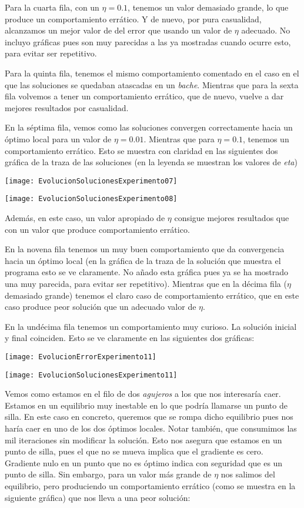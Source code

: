 \documentclass[11pt]{article}
\begin{document}
Para la cuarta fila, con un $\eta = 0.1$, tenemos un valor demasiado grande, lo que produce un comportamiento errático. Y de nuevo, por pura casualidad, alcanzamos un mejor valor de del error que usando un valor de $\eta$ adecuado. No incluyo gráficas pues son muy parecidas a las ya mostradas cuando ocurre esto, para evitar ser repetitivo.

Para la quinta fila, tenemos el mismo comportamiento comentado en el caso en el que las soluciones se quedaban atascadas en un \emph{bache}. Mientras que para la sexta fila volvemos a tener un comportamiento errático, que de nuevo, vuelve a dar mejores resultados por casualidad.

En la séptima fila, vemos como las soluciones convergen correctamente hacia un óptimo local para un valor de $\eta = 0.01$. Mientras que para $\eta = 0.1$, tenemos un comportamiento errático. Esto se muestra con claridad en las siguientes dos gráfica de la traza de las soluciones (en la leyenda se muestran los valores de \emph{eta})

\texttt{[image: EvolucionSolucionesExperimento07]}

\texttt{[image: EvolucionSolucionesExperimento08]}

Además, en este caso, un valor apropiado de $\eta$ consigue mejores resultados que con un valor que produce comportamiento errático.

En la novena fila tenemos un muy buen comportamiento que da convergencia hacia un óptimo local (en la gráfica de la traza de la solución que muestra el programa esto se ve claramente. No añado esta gráfica pues ya se ha mostrado una muy parecida, para evitar ser repetitivo). Mientras que en la décima fila ($\eta$ demasiado grande) tenemos el claro caso de comportamiento errático, que en este caso produce peor solución que un adecuado valor de $\eta$.

En la undécima fila tenemos un comportamiento muy curioso. La solución inicial y final coinciden. Esto se ve claramente en las siguientes dos gráficas:

\texttt{[image: EvolucionErrorExperimento11]}

\texttt{[image: EvolucionSolucionesExperimento11]}

Vemos como estamos en el filo de dos \emph{agujeros} a los que nos interesaría caer. Estamos en un equilibrio muy inestable en lo que podría llamarse un punto de silla. En este caso en concreto, queremos que se rompa dicho equilibrio pues nos haría caer en uno de los dos óptimos locales. Notar también, que consumimos las mil iteraciones sin modificar la solución. Esto nos asegura que estamos en un punto de silla, pues el que no se mueva implica que el gradiente es cero. Gradiente nulo en un punto que no es óptimo indica con seguridad que es un punto de silla. Sin embargo, para un valor más grande de $\eta$ nos salimos del equilibrio, pero produciendo un comportamiento errático (como se muestra en la siguiente gráfica) que nos lleva a una peor solución:
\end{document}
